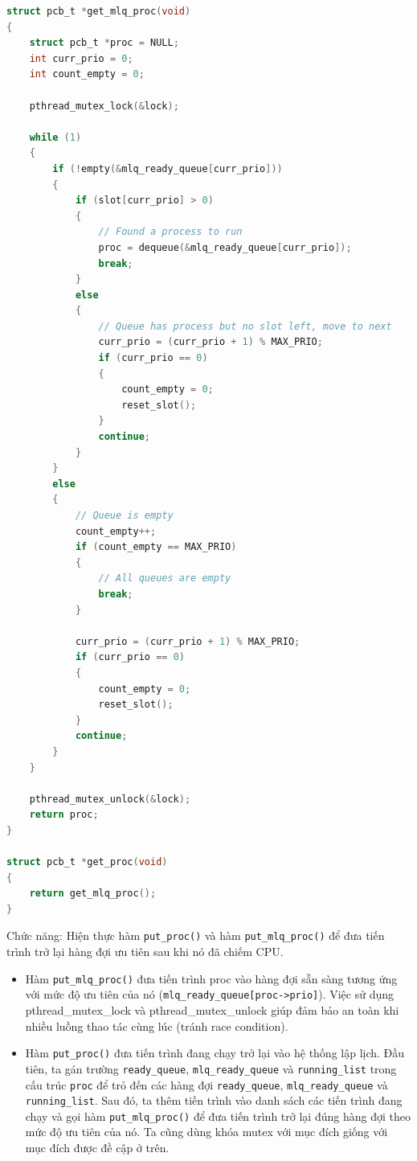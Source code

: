 \begin{lstlisting}[style=Cstyle,language=C]
struct pcb_t *get_mlq_proc(void)
{
    struct pcb_t *proc = NULL;
    int curr_prio = 0;
    int count_empty = 0;

    pthread_mutex_lock(&lock);

    while (1)
    {
        if (!empty(&mlq_ready_queue[curr_prio]))
        {
            if (slot[curr_prio] > 0)
            {
                // Found a process to run
                proc = dequeue(&mlq_ready_queue[curr_prio]);
                break;
            }
            else
            {
                // Queue has process but no slot left, move to next
                curr_prio = (curr_prio + 1) % MAX_PRIO;
                if (curr_prio == 0)
                {
                    count_empty = 0;
                    reset_slot();
                }
                continue;
            }
        }
        else
        {
            // Queue is empty
            count_empty++;
            if (count_empty == MAX_PRIO)
            {
                // All queues are empty
                break;
            }

            curr_prio = (curr_prio + 1) % MAX_PRIO;
            if (curr_prio == 0)
            {
                count_empty = 0;
                reset_slot();
            }
            continue;
        }
    }

    pthread_mutex_unlock(&lock);
    return proc;
}

struct pcb_t *get_proc(void)
{
    return get_mlq_proc();
}

\end{lstlisting}




Chức năng: Hiện thực hàm \texttt{put\_proc()} và hàm \texttt{put\_mlq\_proc()} để đưa tiến trình trở lại hàng đợi ưu tiên sau khi nó đã chiếm CPU.

\begin{itemize}
    \item Hàm \texttt{put\_mlq\_proc()} đưa tiến trình proc vào hàng đợi sẵn sàng tương ứng với mức độ ưu tiên của nó (\texttt{mlq\_ready\_queue[proc->prio]}). Việc sử dụng pthread\_mutex\_lock và pthread\_mutex\_unlock giúp đảm bảo an toàn khi nhiều luồng thao tác cùng lúc (tránh race condition).
    \item Hàm \texttt{put\_proc()} đưa tiến trình đang chạy trở lại vào hệ thống lập lịch. Đầu tiên, ta gán trường \texttt{ready\_queue}, \texttt{mlq\_ready\_queue} và \texttt{running\_list} trong cấu trúc \texttt{proc} để trỏ đến các hàng đợi \texttt{ready\_queue}, \texttt{mlq\_ready\_queue} và \texttt{running\_list}. Sau đó, ta thêm tiến trình vào danh sách các tiến trình đang chạy và gọi hàm \texttt{put\_mlq\_proc()} để đưa tiến trình trở lại đúng hàng đợi theo mức độ ưu tiên của nó. Ta cũng dùng khóa mutex với mục đích giống với mục đích được đề cập ở trên.
\end{itemize}

